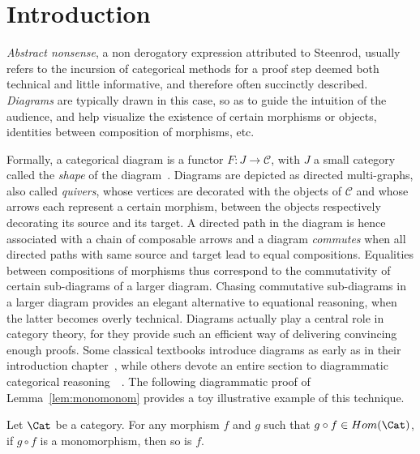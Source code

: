 \section{Introduction}\label{sec:intro}

\emph{Abstract nonsense}, a non derogatory expression attributed to Steenrod, usually refers to the incursion of categorical methods for a proof step deemed both technical and little informative, and therefore often succinctly described. \emph{Diagrams} are typically drawn in this case, so as to guide the intuition of the audience, and help visualize the existence of certain morphisms or objects, identities between composition of morphisms, etc.

Formally, a categorical diagram is a functor $F\colon J \rightarrow \mathcal{C}$, with $J$ a small category called the \emph{shape} of the diagram~\cite{zbMATH01324388}. Diagrams are depicted as directed multi-graphs, also called \emph{quivers}, whose vertices are decorated with the objects of $\mathcal{C}$ and whose arrows each represent a certain morphism, between the objects respectively decorating its source and its target. A directed path in the diagram is hence associated with a chain of composable arrows and a diagram \emph{commutes} when all directed paths with same source and target lead to equal compositions. Equalities between compositions of morphisms thus correspond to the commutativity of certain sub-diagrams of a larger diagram. Chasing commutative sub-diagrams in a larger diagram provides an elegant alternative to equational reasoning, when the latter becomes overly technical. Diagrams actually play a central role in category theory, for they provide such an efficient way of delivering convincing enough proofs. Some classical textbooks introduce diagrams as early as in their introduction chapter~\cite{zbMATH01216133}, while others devote an entire section to diagrammatic categorical reasoning~\cite[Section 1.6]{riehl}~\cite[Session 17]{zbMATH05593534}. The following diagrammatic proof of Lemma~\ref{lem:monomonom} provides a toy illustrative example of this technique.

\begin{lemma}\label{lem:monomonom}
  Let $\Cat$ be a category. For any morphism $f$ and $g$ such that $g \circ f \in Hom(\Cat)$, if $g \circ f$ is a monomorphism, then so is $f$.
\end{lemma}

